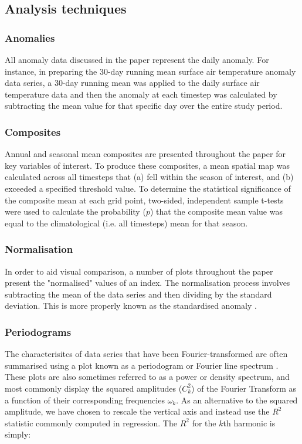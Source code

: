 \subsection{Analysis techniques}

\subsubsection{Anomalies}
All anomaly data discussed in the paper represent the daily anomaly. For instance, in preparing the 30-day running mean surface air temperature anomaly data series, a 30-day running mean was applied to the daily surface air temperature data and then the anomaly at each timestep was calculated by subtracting the mean value for that specific day over the entire study period.

\subsubsection{Composites}
Annual and seasonal mean composites are presented throughout the paper for key variables of interest. To produce these composites, a mean spatial map was calculated across all timesteps that (a) fell within the season of interest, and (b) exceeded a specified threshold value. To determine the statistical significance of the composite mean at each grid point, two-sided, independent sample t-tests were used to calculate the probability ($p$) that the composite mean value was equal to the climatological (i.e. all timesteps) mean for that season.

\subsubsection{Normalisation}
In order to aid visual comparison, a number of plots throughout the paper present the "normalised" values of an index. The normalisation process involves subtracting the mean of the data series and then dividing by the standard deviation. This is more properly known as the standardised anomaly \citep{Wilks2011}. 

\subsubsection{Periodograms} %
The characterisitcs of data series that have been Fourier-transformed are often summarised using a plot known as a periodogram or Fourier line spectrum \citep{Wilks2011}. These plots are also sometimes referred to as a power or density spectrum, and most commonly display the squared amplitudes ($C_k^2$) of the Fourier Transform as a function of their corresponding frequencies $\omega_k$. As an alternative to the squared amplitude, we have chosen to rescale the vertical axis and instead use the $R^2$ statistic commonly computed in regression. The $R^2$ for the $k$th harmonic is simply:


